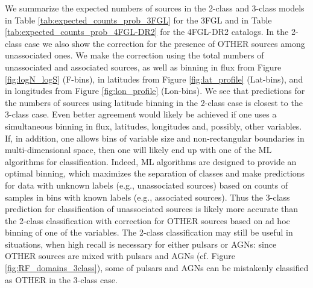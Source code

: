 We summarize the expected numbers of sources in the 2-class and 3-class models in Table \ref{tab:expected_counts_prob_3FGL} for the 3FGL and in Table \ref{tab:expected_counts_prob_4FGL-DR2} for the 4FGL-DR2 catalogs.
In the 2-class case we also show the correction for the presence of OTHER sources among unassociated ones.
We make the correction using the total numbers of unassociated and associated sources, as well as binning in flux from Figure \ref{fig:logN_logS} (F-bins), in latitudes from Figure \ref{fig:lat_profile} (Lat-bins), and in longitudes from Figure  \ref{fig:lon_profile} (Lon-bins).
We see that predictions for the numbers of sources using latitude binning in the 2-class case is closest to the 3-class case.
Even better agreement would likely be achieved if one uses a simultaneous binning in flux, latitudes, longitudes and, possibly, other variables.
If, in addition, one allows bins of variable size and non-rectangular boundaries in multi-dimensional space, then one will likely end up with one of the ML algorithms for classification.
Indeed, ML algorithms are designed to provide an optimal binning, which maximizes the separation of classes and make predictions for data with unknown labels (e.g., unassociated sources) based on counts of samples in bins with known labels (e.g., associated sources).
Thus the 3-class prediction for classification of unassociated sources is likely more accurate than the 2-class classification with correction for OTHER sources based on ad hoc binning of one of the variables.
The 2-class classification may still be useful in situations, when high recall is necessary for either pulsars or AGNs:
since OTHER sources are mixed with pulsars and AGNs (cf. Figure \ref{fig:RF_domains_3class}), 
some of pulsars and AGNs can be mistakenly classified as OTHER in the 3-class case.




\begin{table}[!h]
\vspace{2mm}
\caption{Expected counts of sources among unassociated 3FGL sources.}
\label{tab:expected_counts_prob_3FGL}
\end{table}


